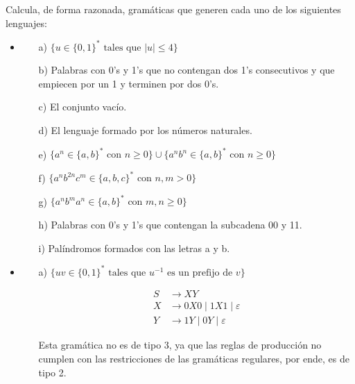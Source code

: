 \documentclass[12pt]{book} %
\begin{document}
\begin{ejercicio}
Calcula, de forma razonada, gramáticas que generen cada uno de los siguientes lenguajes:

\begin{itemize}
    \item {}
    \begin{itemize}
        \item[a)] $\{u \in \{0, 1\}^* \text{ tales que } |u| \leq 4\}$
        \item[b)] Palabras con 0’s y 1’s que no contengan dos 1’s consecutivos y que empiecen por un 1 y terminen por dos 0’s.
        \item[c)] El conjunto vacío.
        \item[d)] El lenguaje formado por los números naturales.
        \item[e)] $\{a^n \in \{a, b\}^* \text{ con } n \geq 0\} \cup \{a^n b^n \in \{a, b\}^* \text{ con } n \geq 0\}$
        \item[f)] $\{a^n b^{2n} c^m \in \{a, b, c\}^* \text{ con } n, m > 0\}$
        \item[g)] $\{a^n b^m a^n \in \{a, b\}^* \text{ con } m, n \geq 0\}$
        \item[h)] Palabras con 0’s y 1’s que contengan la subcadena 00 y 11.
        \item[i)] Palíndromos formados con las letras a y b.
    \end{itemize}

    \item {}
    \begin{itemize}
        \item[a)] $\{uv \in \{0, 1\}^* \text{ tales que } u^{-1} \text{ es un prefijo de } v\}$
        \begin{solucion}[media.a]

        \begin{align*}
        S &\rightarrow XY \\
        X &\rightarrow 0X0 \mid 1X1 \mid \varepsilon \\
        Y &\rightarrow 1Y \mid 0Y \mid \varepsilon 
        \end{align*}

        Esta gramática no es de tipo 3, ya que las reglas de producción no cumplen con las restricciones de las gramáticas regulares, por ende, es de tipo 2.

        \end{solucion}


\end{itemize}
\end{itemize}
\end{ejercicio}
\end{document}
